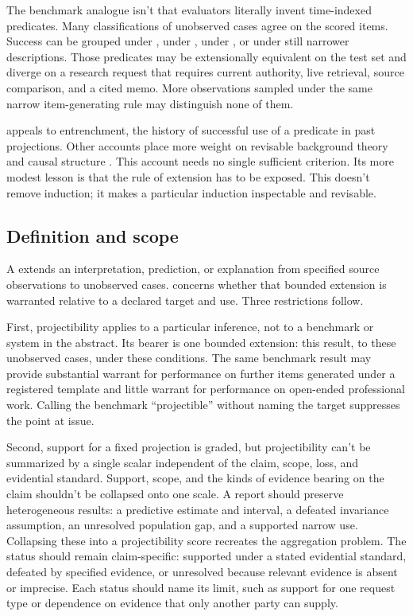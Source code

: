 \documentclass[12pt]{article}
\begin{document}
The benchmark analogue isn't that evaluators literally invent time-indexed predicates. Many classifications of unobserved cases agree on the scored items. Success can be grouped under , under , under , or under still narrower descriptions. Those predicates may be extensionally equivalent on the test set and diverge on a research request that requires current authority, live retrieval, source comparison, and a cited memo. More observations sampled under the same narrow item-generating rule may distinguish none of them.

\Textcite[84--98]{goodman1983} appeals to entrenchment, the history of successful use of a predicate in past projections. Other accounts place more weight on revisable background theory and causal structure \citep{boyd1991,khalidi2013}. This account needs no single sufficient criterion. Its more modest lesson is that the rule of extension has to be exposed. This doesn't remove induction; it makes a particular induction inspectable and revisable.

\subsection{Definition and scope}\label{ssec:definition}

A  extends an interpretation, prediction, or explanation from specified source observations to unobserved cases.  concerns whether that bounded extension is warranted relative to a declared target and use. Three restrictions follow.

First, projectibility applies to a particular inference, not to a benchmark or system in the abstract. Its bearer is one bounded extension: this result, to these unobserved cases, under these conditions. The same benchmark result may provide substantial warrant for performance on further items generated under a registered template and little warrant for performance on open-ended professional work. Calling the benchmark \enquote{projectible} without naming the target suppresses the point at issue.

Second, support for a fixed projection is graded, but projectibility can't be summarized by a single scalar independent of the claim, scope, loss, and evidential standard. Support, scope, and the kinds of evidence bearing on the claim shouldn't be collapsed onto one scale. A report should preserve heterogeneous results: a predictive estimate and interval, a defeated invariance assumption, an unresolved population gap, and a supported narrow use. Collapsing these into a projectibility score recreates the aggregation problem. The status should remain claim-specific: supported under a stated evidential standard, defeated by specified evidence, or unresolved because relevant evidence is absent or imprecise. Each status should name its limit, such as support for one request type or dependence on evidence that only another party can supply.
\end{document}
